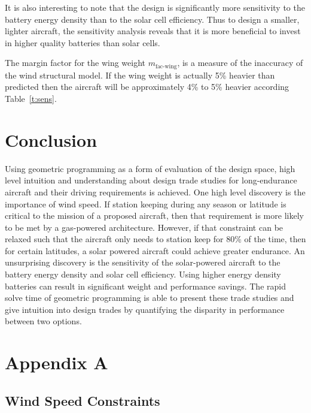 \documentclass[]{aiaa-tc}%
\begin{document}
It is also interesting to note that the design is significantly more sensitivity to the battery energy density than to the solar cell efficiency.  
Thus to design a smaller, lighter aircraft, the sensitivity analysis reveals that it is more beneficial to invest in higher quality batteries than solar cells. 

The margin factor for the wing weight $m_{\text{fac-wing}}$, is a measure of the inaccuracy of the wind structural model.  
If the wing weight is actually 5\% heavier than predicted then the aircraft will be approximately 4\% to 5\% heavier according Table~\ref{t:sens}.



\section{Conclusion}

Using geometric programming as a form of evaluation of the design space, high level intuition and understanding about design trade studies for long-endurance aircraft and their driving requirements is achieved.  
One high level discovery is the importance of wind speed.  
If station keeping during any season or latitude is critical to the mission of a proposed aircraft, then that requirement is more likely to be met by a gas-powered architecture.
However, if that constraint can be relaxed such that the aircraft only needs to station keep for 80\% of the time, then for certain latitudes, a solar powered aircraft could achieve greater endurance.
An unsurprising discovery is the sensitivity of the solar-powered aircraft to the battery energy density and solar cell efficiency.  Using higher energy density batteries can result in significant weight and performance savings.  
The rapid solve time of geometric programming is able to present these trade studies and give intuition into design trades by quantifying the disparity in performance between two options.





\section*{Appendix A}

\subsection{Wind Speed Constraints}
\end{document}
